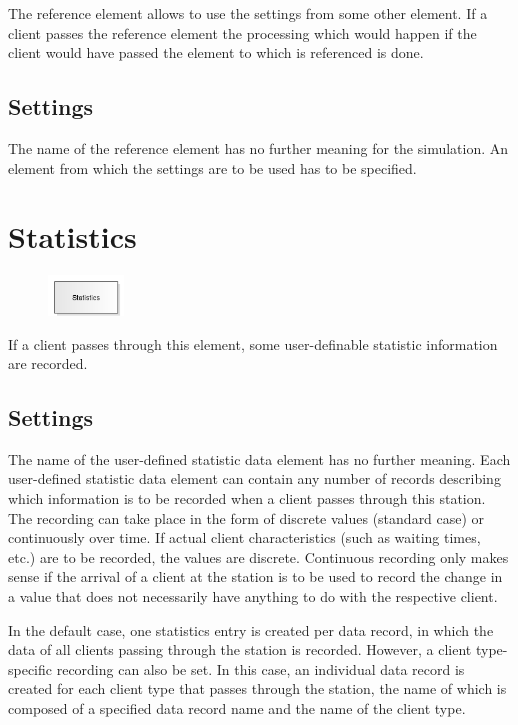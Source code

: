 The reference element allows to use the settings from some other element.
If a client passes the reference element the processing which would happen
if the client would have passed the element to which is referenced is done.

\subsection*{Settings}

The name of the reference element has no further meaning for the simulation.
An element from which the settings are to be used has to be specified.


\section{Statistics}
\label{ref:ModelElementUserStatistic}

\begin{figure}
\vspace{-22pt}
\includegraphics[width=2cm]{imageModelElementUserStatistic.png}
\vspace{-22pt}
\end{figure}

If a client passes through this element, some user-definable statistic information are recorded.

\subsection*{Settings}

The name of the user-defined statistic data element has no further meaning.
Each user-defined statistic data element can contain any number of records
describing which information is to be recorded when a client passes through
this station. The recording can take place in the form of discrete values
(standard case) or continuously over time. If actual client characteristics
(such as waiting times, etc.) are to be recorded, the values are discrete.
Continuous recording only makes sense if the arrival of a client at the station
is to be used to record the change in a value that does not necessarily have
anything to do with the respective client.

In the default case, one statistics entry is created per data record,
in which the data of all clients passing through the station is recorded.
However, a client type-specific recording can also be set. In this case,
an individual data record is created for each client type that passes through
the station, the name of which is composed of a specified data record name
and the name of the client type.


